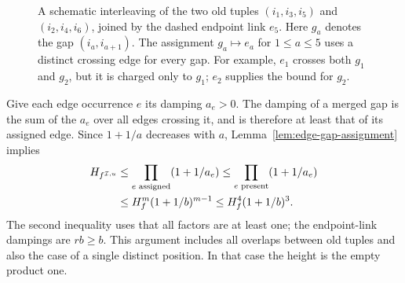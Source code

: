 \begin{figure}[htbp]
\centering
{}
\caption{A schematic interleaving of the two old tuples
$(i_1,i_3,i_5)$ and $(i_2,i_4,i_6)$, joined by the dashed endpoint link
$e_5$. Here $g_a$ denotes the gap $(i_a,i_{a+1})$.
The assignment $g_a\mapsto e_a$ for $1\le a\le5$ uses a distinct
crossing edge for every gap. For example,
$e_1$ crosses both $g_1$ and $g_2$, but it is charged only to $g_1$;
$e_2$ supplies the bound for $g_2$.}
\label{fig:edge-gap-assignment}
\end{figure}

Give each edge occurrence $e$ its damping $a_e>0$. The damping of a
merged gap is the sum of the $a_e$ over all edges crossing it, and is
therefore at least that of its assigned edge. Since $1+1/a$ decreases
with $a$, Lemma~\ref{lem:edge-gap-assignment} implies
\begin{align}
 H_{f^{\mathcal I,u}}
 &\le\prod_{e\text{ assigned}}(1+1/a_e)
 \le\prod_{e\text{ present}}(1+1/a_e) \notag\\
 &\le H_f^m(1+1/b)^{m-1}
 \le H_f^4(1+1/b)^3.
 \label{eq:interleaving-height}
\end{align}
The second inequality uses that all factors are at least one; the
endpoint-link dampings are $rb\ge b$. This argument includes all
overlaps between old tuples and also the case of a single distinct
position. In that case the height is the empty product one.

